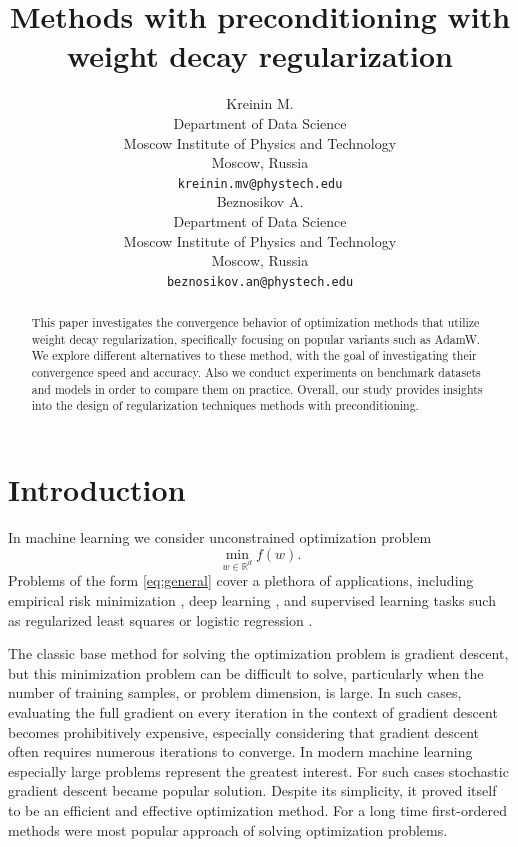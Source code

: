 \documentclass{article}
\title{Methods with preconditioning with weight decay regularization}
\author{Kreinin M. \\
	Department of Data Science\\
	Moscow Institute of Physics and Technology\\
	Moscow, Russia \\
	\texttt{kreinin.mv@phystech.edu} \\
        \And
        Beznosikov A. \\
	Department of Data Science\\
	Moscow Institute of Physics and Technology\\
	Moscow, Russia \\
	\texttt{beznosikov.an@phystech.edu} \\
}
\begin{document}
\maketitle

\begin{abstract}
This paper investigates the convergence behavior of optimization methods that utilize weight decay regularization, specifically focusing on popular variants such as AdamW.
We explore different alternatives to these method, with the goal of investigating their convergence speed and accuracy.
Also we conduct experiments on benchmark datasets and models in order to compare them on practice.
Overall, our study provides insights into the design of regularization techniques methods with preconditioning.
\end{abstract}


\section{Introduction}

In machine learning we consider unconstrained optimization problem
\begin{equation}
    \label{eq:general}
	\min_{w \in \mathbb{R}^d} f(w).
\end{equation}
Problems of the form \eqref{eq:general} cover a plethora of applications, including empirical risk minimization \citep{chapelle2000vicinal},
deep learning \citep{lecun2015deep}, and supervised learning \citep{cunningham2008supervised} tasks such as regularized least squares \citep{rifkin2007notes} or logistic regression \citep{shalev2014understanding}.

The classic base method for solving the optimization problem is gradient descent, but this minimization problem can be difficult to solve, particularly when the number of training samples, or problem dimension, is large.
In such cases, evaluating the full gradient on every iteration in the context of gradient descent becomes prohibitively expensive, especially considering that gradient descent often requires numerous iterations to converge.
In modern machine learning especially large problems represent the greatest interest.
For such cases stochastic gradient descent \citep{robbins1951stochastic} became popular solution.
Despite its simplicity, it proved itself to be an efficient and effective optimization method.
For a long time first-ordered methods were most popular approach of solving optimization problems.
\end{document}
